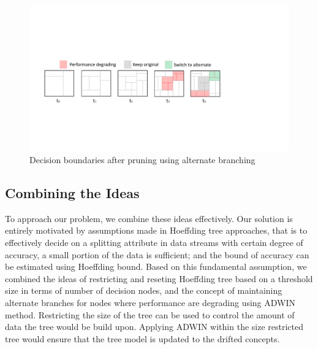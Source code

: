 \begin{figure}[htbp]
    \begin{center}
        \includegraphics[width=14.0cm]{figs/prunedb.pdf}
        \caption{Decision boundaries after pruning using alternate branching}
        \label{fig:algo:prunedb}
    \end{center}
\end{figure}

\subsection{Combining the Ideas}
To approach our problem, we combine these ideas effectively. Our solution is entirely motivated by assumptions made in Hoeffding tree approaches, that is to effectively decide on a splitting attribute in data streams with certain degree of accuracy, a small portion of the data is  sufficient; and the bound of accuracy can be estimated using Hoeffding bound. Based on this fundamental assumption, we combined the ideas of restricting and reseting Hoeffding tree based on a threshold size in terms of number of decision nodes, and the concept of maintaining alternate branches for nodes where performance are degrading using ADWIN method. Restricting the size of the tree can be used to control the amount of data the tree would be build upon. Applying ADWIN within the size restricted tree would ensure that the tree model is updated to the drifted concepts. 

